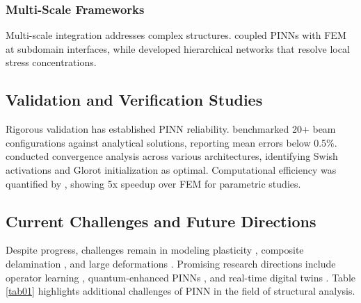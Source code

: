 \documentclass[12pt]{article}
\begin{document}
\subsubsection{Multi-Scale Frameworks}
Multi-scale integration addresses complex structures. \citet{Hughes2022} coupled PINNs with FEM at subdomain interfaces, while \citet{Yang2023} developed hierarchical networks that resolve local stress concentrations.

\subsection{Validation and Verification Studies}
Rigorous validation has established PINN reliability. \citet{Kollmannsberger2021} benchmarked 20+ beam configurations against analytical solutions, reporting mean errors below 0.5\%. \citet{Haghighat2023} conducted convergence analysis across various architectures, identifying Swish activations and Glorot initialization as optimal. Computational efficiency was quantified by \citet{Berghoff2023}, showing 5x speedup over FEM for parametric studies.

\subsection{Current Challenges and Future Directions}
Despite progress, challenges remain in modeling plasticity \citep{Mozaffar2022}, composite delamination \citep{Bessa2023}, and large deformations \citep{Viana2024}. Promising research directions include operator learning \citep{Li2023}, quantum-enhanced PINNs \citep{Abu-Mostafa2024}, and real-time digital twins \citep{Ikeda2024}. Table \ref{tab01} highlights additional challenges of PINN in the field of structural analysis. 

\begin{table}
	\centering
	\captionsetup{justification=centering}
	\caption{More challenges in PINN application to structural problems}
	\label{tab01}
\end{table}
\end{document}
